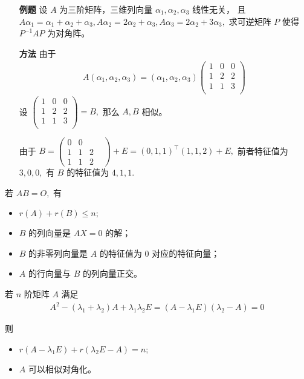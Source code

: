 \begin{enumerate}
    \item[\textbf{例题}] 设 $ A $ 为三阶矩阵，三维列向量 $ \alpha_1,\alpha_2,\alpha_3 $ 线性无关，
    且 $ A\alpha_1 = \alpha_1+\alpha_2+\alpha_3, 
    A\alpha_2 = 2\alpha_2+\alpha_3,
    A\alpha_3 = 2\alpha_2+3\alpha_3, $ 
    求可逆矩阵 $ P $ 使得 $ P^{-1}AP $ 为对角阵。
    \item[\textbf{方法}]
    由于
    \begin{equation*}
        \begin{aligned}
            A(\alpha_1,\alpha_2,\alpha_3) = (\alpha_1,\alpha_2,\alpha_3)
            \begin{pmatrix}
                1&0&0\\1&2&2\\1&1&3\\
            \end{pmatrix}
        \end{aligned}
    \end{equation*}
    设 $ \begin{pmatrix}
        1&0&0\\1&2&2\\1&1&3\\
    \end{pmatrix} = B, $ 
    那么 $ A,B $ 相似。

    由于 $ B = \begin{pmatrix}
        0&0&&\\1&1&2\\1&1&2
    \end{pmatrix}+E=(0,1,1)^\top(1,1,2) + E, $ 
    前者特征值为 $ 3,0,0, $ 有 $ B $ 的特征值为 $ 4,1,1. $ 
\end{enumerate}


若 $ AB = O, $ 有
\begin{itemize}
    \item $ r(A)+r(B)\leq n; $ 
    \item $ B $ 的列向量是 $ AX=0 $ 的解；
    \item $ B $ 的非零列向量是 $ A $ 的特征值为 $ 0 $ 对应的特征向量；
    \item $ A $ 的行向量与 $ B $ 的列向量正交。
\end{itemize}


若 $ n $ 阶矩阵 $ A $ 满足
\begin{equation*}
    \begin{aligned}
        A^2 - (\lambda_1+\lambda_2)A + \lambda_1\lambda_2E = 
        (A-\lambda_1E)(\lambda_2-A) = 0
    \end{aligned}
\end{equation*}

则\begin{itemize}
    \item $ r(A-\lambda_1E) + r(\lambda_2E-A) = n; $ 
    \item $ A $ 可以相似对角化。
\end{itemize}